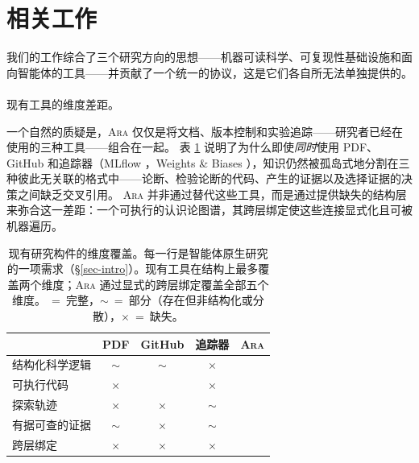\documentclass[
]{article}
\makeatletter
\let\oldparagraph\paragraph
\renewcommand{\paragraph}{
    \@ifstar
      \xxxParagraphStar
      \xxxParagraphNoStar
  }
\newcommand{\xxxParagraphStar}[1]{\oldparagraph*{#1}\mbox{}}
\newcommand{\xxxParagraphNoStar}[1]{\oldparagraph{#1}\mbox{}}
\newcommand{\cmark}{\textcolor{green!60!black}{\ding{51}}}
\theoremstyle{definition}
\newcommand{\ara}{\textsc{Ara}}
\makeatother
\begin{document}
\FloatBarrier

\section{相关工作}\label{sec-related}

我们的工作综合了三个研究方向的思想------机器可读科学、可复现性基础设施和面向智能体的工具------并贡献了一个统一的协议，这是它们各自所无法单独提供的。

\paragraph{现有工具的维度差距。}\label{ux73b0ux6709ux5de5ux5177ux7684ux7ef4ux5ea6ux5deeux8ddd}

一个自然的质疑是，\ara{}
仅仅是将文档、版本控制和实验追踪------研究者已经在使用的三种工具------组合在一起。
表 \ref{tab-dimension-gap} 说明了为什么即使\emph{同时}使用 PDF、GitHub
和追踪器（MLflow \citep{zaharia2018mlflow}，Weights \& Biases
\citep{biewald2020wandb}），知识仍然被孤岛式地分割在三种彼此无关联的格式中------论断、检验论断的代码、产生的证据以及选择证据的决策之间缺乏交叉引用。
\ara{}
并非通过替代这些工具，而是通过提供缺失的结构层来弥合这一差距：一个可执行的认识论图谱，其跨层绑定使这些连接显式化且可被机器遍历。

\begin{table}[t]
\centering
\small
\setlength{\tabcolsep}{4pt}
\begin{tabular}{@{}lcccc@{}}
\toprule
& \textbf{PDF} & \textbf{GitHub} & \textbf{追踪器} & \textbf{\ara{}} \\
\midrule
结构化科学逻辑      & {\color{orange}$\sim$} & {\color{orange}$\sim$} & {\color{red!70!black}$\times$} & {\color{green!50!black}\cmark} \\
可执行代码            & {\color{red!70!black}$\times$} & {\color{green!50!black}\cmark} & {\color{red!70!black}$\times$} & {\color{green!50!black}\cmark} \\
探索轨迹              & {\color{red!70!black}$\times$} & {\color{red!70!black}$\times$} & {\color{orange}$\sim$} & {\color{green!50!black}\cmark} \\
有据可查的证据   & {\color{orange}$\sim$} & {\color{red!70!black}$\times$} & {\color{orange}$\sim$} & {\color{green!50!black}\cmark} \\
跨层绑定              & {\color{red!70!black}$\times$} & {\color{red!70!black}$\times$} & {\color{red!70!black}$\times$} & {\color{green!50!black}\cmark} \\
\bottomrule
\end{tabular}
\caption{现有研究构件的维度覆盖。每一行是智能体原生研究的一项需求（\S\ref{sec-intro}）。现有工具在结构上最多覆盖两个维度；\ara{} 通过显式的跨层绑定覆盖全部五个维度。{\color{green!50!black}\cmark}~=~完整，{\color{orange}$\sim$}~=~部分（存在但非结构化或分散），{\color{red!70!black}$\times$}~=~缺失。}
\label{tab-dimension-gap}
\end{table}
\end{document}
